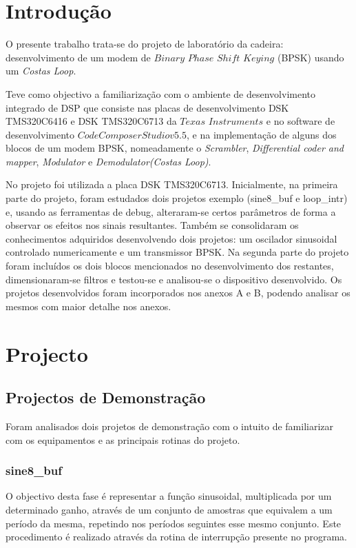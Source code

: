 \documentclass[11pt]{article}
\numberwithin{equation}{section}
\begin{document}
\section{Introdução}
O presente trabalho trata-se do projeto de laboratório da cadeira: desenvolvimento de um modem de $Binary$ $Phase$ $Shift$ $Keying$ (BPSK) usando um \textit{Costas Loop}. 

Teve como objectivo a familiarização com o ambiente de desenvolvimento integrado de DSP que consiste nas placas de desenvolvimento DSK TMS320C6416 e DSK TMS320C6713 da $Texas$ $Instruments$ e no software de desenvolvimento $Code Composer Studio v5.5$, e na implementação de alguns dos blocos de um modem BPSK, nomeadamente o \textit{Scrambler},  \textit{Differential coder and mapper}, \textit{Modulator} e \textit{Demodulator(Costas Loop)}.

No projeto foi utilizada a placa DSK TMS320C6713. Inicialmente, na primeira parte do projeto, foram estudados dois projetos exemplo (sine8\_buf e loop\_intr) e, usando as ferramentas de debug, alteraram-se certos parâmetros de forma a observar os efeitos nos sinais resultantes. Também se consolidaram os conhecimentos adquiridos desenvolvendo dois projetos: um oscilador sinusoidal controlado numericamente e um transmissor BPSK. Na segunda parte do projeto foram incluídos os dois blocos mencionados no desenvolvimento dos restantes, dimensionaram-se filtros e testou-se e analisou-se o dispositivo desenvolvido. Os projetos desenvolvidos foram incorporados nos anexos A e B, podendo analisar os mesmos com maior detalhe nos anexos.

\section{Projecto}

\subsection{Projectos de Demonstração}
Foram analisados dois projetos de demonstração com o intuito de familiarizar com os equipamentos e as principais rotinas do projeto.

\subsubsection{sine8\_buf}
\label{sec:sine8}
O objectivo desta fase é representar a função sinusoidal, multiplicada por um determinado ganho, através de um conjunto de amostras que equivalem a um período da mesma, repetindo nos períodos seguintes esse mesmo conjunto. Este procedimento é realizado através da rotina de interrupção presente no programa. 
\end{document}
